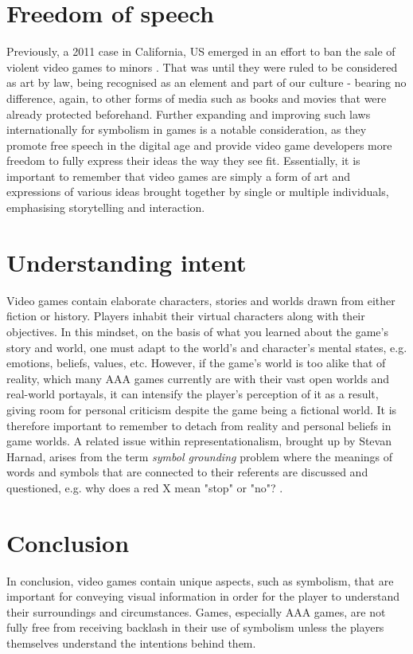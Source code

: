 \documentclass{scrartcl}
\begin{document}
\section{Freedom of speech}
Previously, a 2011 case in California, US emerged in an effort to ban the sale of violent video games to minors \cite{brownv}. That was until they were ruled to be considered as art by law, being recognised as an element and part of our culture - bearing no difference, again, to other forms of media such as books and movies that were already protected beforehand. Further expanding and improving such laws internationally for symbolism in games is a notable consideration, as they promote free speech in the digital age and provide video game developers more freedom to fully express their ideas the way they see fit. Essentially, it is important to remember that video games are simply a form of art and expressions of various ideas brought together by single or multiple individuals, emphasising storytelling and interaction.


\section{Understanding intent}
Video games contain elaborate characters, stories and worlds drawn from either fiction or history. Players inhabit their virtual characters along with their objectives. In this mindset, on the basis of what you learned about the game's story and world, one must adapt to the world's and character's mental states, e.g. emotions, beliefs, values, etc. However, if the game's world is too alike that of reality, which many AAA games currently are with their vast open worlds and real-world portayals, it can intensify the player's perception of it as a result, giving room for personal criticism despite the game being a fictional world. It is therefore important to remember to detach from reality and personal beliefs in game worlds. A related issue within representationalism, brought up by Stevan Harnad, arises from the term \textit{symbol grounding} problem where the meanings of words and symbols that are connected to their referents are discussed and questioned, e.g. why does a red X mean "stop" or "no"? \cite{harnad} \cite{davidmyers}.


\section{Conclusion}
In conclusion, video games contain unique aspects, such as symbolism, that are important for conveying visual information in order for the player to understand their surroundings and circumstances. Games, especially AAA games, are not fully free from receiving backlash in their use of symbolism unless the players themselves understand the intentions behind them.





\end{document}
